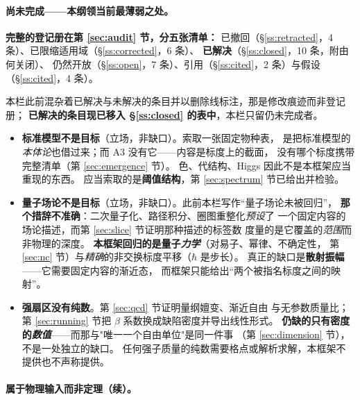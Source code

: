 \documentclass[11pt,a4paper]{article}
\theoremstyle{sudef}
\begin{document}
\paragraph{尚未完成——本纲领当前最薄弱之处。}

\begin{mdframed}[linecolor=axcol,linewidth=1pt,backgroundcolor=axcol!5]
\textbf{完整的登记册在第 \ref{sec:audit} 节，分五张清单：}
已撤回（\S\ref{ss:retracted}，4 条）、已限缩适用域（\S\ref{ss:corrected}，6 条）、
\textbf{已解决}（\S\ref{ss:closed}，10 条，附由何关闭）、
仍然开放（\S\ref{ss:open}，7 条）、引用（\S\ref{ss:cited}，2 条）与假设（\S\ref{ss:cited}，4 条）。

本栏此前混杂着已解决与未解决的条目并以删除线标注，那是修改痕迹而非登记册；
\textbf{已解决的条目现已移入 \S\ref{ss:closed} 的表中}，本栏只留仍未完成者。
\end{mdframed}
\begin{itemize}[leftmargin=1.6em]
\item \textbf{标准模型不是目标}（立场，非缺口）。索取一张固定物种表，
      是把标准模型的\emph{本体论}也借过来；而 A3 没有它——内容是标度上的截面，
      没有哪个标度携带完整清单（第 \ref{sec:emergence} 节）。
      色、代结构、Higgs 因此不是本框架应当重现的东西。
      应当索取的是\textbf{阈值结构}，第 \ref{sec:spectrum} 节已给出并检验。

\item \textbf{量子场论不是目标}（立场，非缺口）。此前本栏写作“量子场论未被回归”，
      \textbf{那个措辞不准确}：二次量子化、路径积分、圈图重整化\emph{预设}了
      一个固定内容的场论描述，而第 \ref{sec:slice} 节证明那种描述的标签数
      度量的是它覆盖的\emph{范围}而非物理的深度。
      \textbf{本框架回归的是量子\emph{力学}}（对易子、幂律、不确定性，
      第 \ref{sec:nc} 节）与\emph{精确}的非交换标度平移（$\hbar$ 是步长）。
      真正的缺口是\textbf{散射振幅}——它需要固定内容的渐近态，
      而框架只能给出“两个被指名标度之间的映射”。

\item \textbf{强扇区没有纯数}。第 \ref{sec:qcd} 节证明量纲嬗变、渐近自由
      与无参数质量比；第 \ref{sec:running} 节把 $\beta$ 系数换成缺陷密度并导出线性形式。
      \textbf{仍缺的只有密度的\emph{数值}}——而那与"唯一一个自由单位"是同一件事
      （第 \ref{sec:dimension} 节），不是一处独立的缺口。
      任何强子质量的纯数需要格点或解析求解，本框架不提供也不声称提供。
\end{itemize}

\paragraph{属于物理输入而非定理（续）。}
\end{document}
